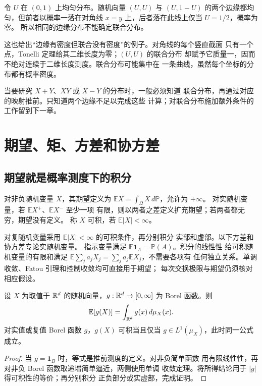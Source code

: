 令 \(U\) 在 \((0,1)\) 上均匀分布。随机向量 \((U,U)\) 与
\((U,1-U)\) 的两个边缘都均匀，但前者以概率一落在对角线
\(x=y\) 上，后者落在此线上仅当 \(U=1/2\)，概率为零。
所以相同的边缘分布不能确定联合分布。

这也给出“边缘有密度但联合没有密度”的例子。对角线的每个竖直截面
只有一个点，Tonelli 定理给其二维长度为零；\((U,U)\) 的联合分布
却赋予它质量一，因而不绝对连续于二维长度测度。联合分布可能集中在
一条曲线，虽然每个坐标的分布都有概率密度。

当要研究 \(X+Y\)、\(XY\) 或 \(X-Y\) 的分布时，一般必须知道
联合分布，再通过对应的映射推前。只知道两个边缘不足以完成这些
计算；对联合分布施加额外条件的工作留到下一章。

\section{期望、矩、方差和协方差}
\label{sec:expectation-moments-covariance}

\subsection{期望就是概率测度下的积分}

\begin{definition}\label{def:expectation}
对非负随机变量 \(X\)，其期望定义为
\(\mathbb E X=\int_\Omega X\,d\mathbb P\)，允许为 \(+\infty\)。
对实随机变量，若 \(\mathbb E X^+\)、\(\mathbb E X^-\) 至少一项
有限，则以两者之差定义扩充期望；若两者都无穷，期望没有定义。
称 \(X\) 可积，若 \(\mathbb E|X|<\infty\)。
\end{definition}

对复随机变量采用 \(\mathbb E|X|<\infty\) 的可积条件，再分别积分
实部和虚部。以下方差和协方差专论实随机变量。
指示变量满足 \(\mathbb E\mathbf1_A=\mathbb P(A)\)。积分的线性性
给可积随机变量的有限和满足
\(\mathbb E\sum_j a_jX_j=\sum_j a_j\mathbb E X_j\)，不需要各项有
任何独立关系。单调收敛、Fatou 引理和控制收敛均可直接用于期望；
每次交换极限与期望仍须核对相应假设。

\begin{theorem}[按分布计算期望]\label{thm:expectation-by-law}
设 \(X\) 为取值于 \(\mathbb{R}^d\) 的随机向量，\(g:\mathbb{R}^d\to[0,\infty]\)
为 Borel 函数。则
\begin{equation}\label{eq:expectation-by-law}
 \mathbb E[g(X)]=\int_{\mathbb{R}^d}g(x)\,d\mu_X(x).
\end{equation}
对实值或复值 Borel 函数 \(g\)，\(g(X)\) 可积当且仅当
\(g\in L^1(\mu_X)\)，此时同一公式成立。
\end{theorem}
\begin{proof}
当 \(g=\mathbf1_B\) 时，等式是推前测度的定义。对非负简单函数
用有限线性性，再对非负 Borel 函数取递增简单逼近，两侧使用单调
收敛定理。将所得结论用于 \(|g|\) 得可积性的等价；再分别积分
正负部分或实虚部，完成证明。
\end{proof}


